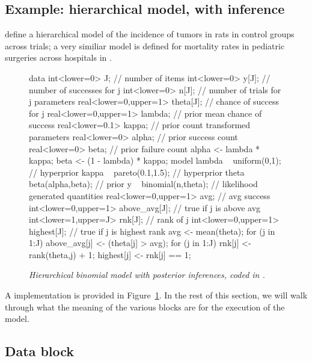 \documentclass[article]{jss}
\begin{document}
\subsection{Example: hierarchical model, with inference}\label{hierarchical-modeling.section}

\cite[Section 5.1]{GelmanEtAl:2013} define a hierarchical model of the
incidence of tumors in rats in control groups across trials; a very
similiar model is defined for mortality rates in pediatric surgeries
across hospitals in \citep[Examples, Volume
1]{LunnEtAl:2000,LunnEtAl:2009}.  
%  
\begin{figure}
\begin{Code}
data {
  int<lower=0> J;                         // number of items
  int<lower=0> y[J];                      // number of successes for j
  int<lower=0> n[J];                      // number of trials for j
}
parameters {
  real<lower=0,upper=1> theta[J];        // chance of success for j
  real<lower=0,upper=1> lambda;          // prior mean chance of success
  real<lower=0.1> kappa;                 // prior count
}
transformed parameters {
  real<lower=0> alpha;                   // prior success count
  real<lower=0> beta;                    // prior failure count
  alpha <- lambda * kappa;
  beta <- (1 - lambda) * kappa;
}
model {
  lambda ~ uniform(0,1);                 // hyperprior
  kappa ~ pareto(0.1,1.5);               // hyperprior 
  theta ~ beta(alpha,beta);              // prior
  y ~ binomial(n,theta);                 // likelihood
}
generated quantities {
  real<lower=0,upper=1> avg;             // avg success
  int<lower=0,upper=1> above_avg[J];     // true if j is above avg
  int<lower=1,upper=J> rnk[J];           // rank of j
  int<lower=0,upper=1> highest[J];          // true if j is highest rank
  avg <- mean(theta);
  for (j in 1:J)
    above_avg[j] <- (theta[j] > avg);
  for (j in 1:J) {
    rnk[j] <- rank(theta,j) + 1;
    highest[j] <- rnk[j] == 1;
  }
}
\end{Code}
  \caption{\it Hierarchical binomial model with posterior inferences,
    coded in .}\label{hier-binom.fig}
\end{figure}
%
A  implementation is provided in
Figure~\ref{hier-binom.fig}.  In the rest of this section, we will
walk through what the meaning of the various blocks are for the
execution of the model.

\subsection{Data block}
\end{document}
